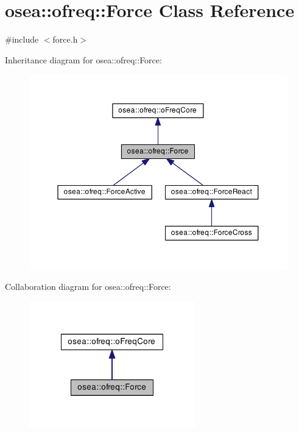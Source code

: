 \hypertarget{classosea_1_1ofreq_1_1_force}{\section{osea\-:\-:ofreq\-:\-:Force Class Reference}
\label{classosea_1_1ofreq_1_1_force}
}


{\ttfamily \#include $<$force.\-h$>$}



Inheritance diagram for osea\-:\-:ofreq\-:\-:Force\-:\nopagebreak
\begin{figure}[H]
\begin{center}
\leavevmode
\includegraphics[width=350pt]{classosea_1_1ofreq_1_1_force__inherit__graph}
\end{center}
\end{figure}


Collaboration diagram for osea\-:\-:ofreq\-:\-:Force\-:\nopagebreak
\begin{figure}[H]
\begin{center}
\leavevmode
\includegraphics[width=204pt]{classosea_1_1ofreq_1_1_force__coll__graph}
\end{center}
\end{figure}
